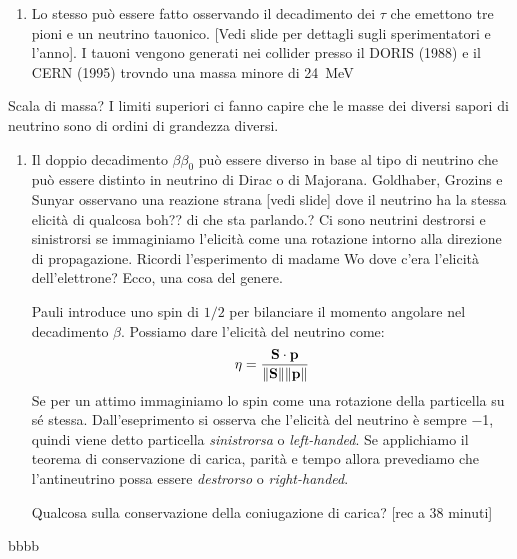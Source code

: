 \begin{enumerate}
                Affinché questi esperimenti siano utili è necessario riconoscere tutte le interazioni che possono avvenire a valle. Comunque nello sciame secondario possono esserci pioni neutri o pioni carici, quelli neutri decadono in due gamma mentre quelli carichi decadono in coppie di muoni e neutrini. Quello che si fa è quindi generare sciami che contengano pioni e osservare i neutrini emessi dal suo decadimento. da qui massa del neutrino munoico minore di \SI{120}{\kilo\eV} %

                \item Lo stesso può essere fatto osservando il decadimento dei $\tau$ che emettono tre pioni e un neutrino tauonico. [Vedi slide per dettagli sugli sperimentatori e l'anno]. I tauoni vengono generati nei collider presso il DORIS (1988) e il CERN (1995) trovndo una massa minore di \SI{24}{\mega\eV}
            \end{enumerate}
            Scala di massa? I limiti superiori ci fanno capire che le masse dei diversi sapori di neutrino sono di ordini di grandezza diversi.
            \begin{enumerate}
                \item Il doppio decadimento $\beta\beta_0$ può essere diverso in base al tipo di neutrino che può essere distinto in neutrino di Dirac o di Majorana. Goldhaber, Grozins e Sunyar osservano una reazione strana [vedi slide] dove il neutrino ha la stessa elicità di qualcosa boh?? di che sta parlando.? Ci sono neutrini destrorsi e sinistrorsi se immaginiamo l'elicità come una rotazione intorno alla direzione di propagazione. Ricordi l'esperimento di madame Wo dove c'era l'elicità dell'elettrone? Ecco, una cosa del genere.
                
                Pauli introduce uno spin di $1/2$ per bilanciare il momento angolare nel decadimento $\beta$. Possiamo dare l'elicità del neutrino come:
                \begin{equation*}
                    \eta = \frac{\vb{S}\cdot\vb{p}}{\norm{\vb{S}}\norm{\vb{p}}}
                \end{equation*}
                Se per un attimo immaginiamo lo spin come una rotazione della particella su sé stessa. Dall'eseprimento si osserva che l'elicità del neutrino è sempre \num{-1}, quindi viene detto particella \emph{sinistrorsa} o \emph{left-handed}. Se applichiamo il teorema di conservazione di carica, parità e tempo allora prevediamo che l'antineutrino possa essere \emph{destrorso} o \emph{right-handed}.

                Qualcosa sulla conservazione della coniugazione di carica? [rec a 38 minuti]

                
            \end{enumerate}bbbb
